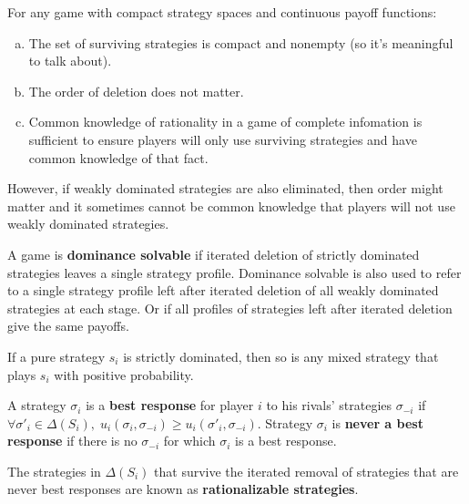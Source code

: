 \documentclass[10pt]{article}
\begin{document}
\begin{spacing}{1.0}
\begin{theorem}
  For any game with compact strategy spaces and continuous payoff functions:
  \begin{enumerate}[a)]\leftskip = 1em
  \item The set of surviving strategies is compact and
    nonempty (so it's meaningful to talk about).
  \item The order of deletion does not matter.
  \item Common knowledge of rationality in a game of complete infomation is
    sufficient to ensure players will only use surviving strategies and
    have common knowledge of that fact.
  \end{enumerate}
\end{theorem}

However, if weakly dominated strategies are also eliminated, then
order might matter and it sometimes cannot be common knowledge that players
will not use weakly dominated strategies.

\begin{definition}
  A game is \textbf{dominance solvable} if iterated deletion of strictly dominated
  strategies leaves a single strategy profile. Dominance solvable is also used to
  refer to a single strategy profile left after iterated deletion of all weakly
  dominated strategies at each stage. Or if all profiles of strategies left after
  iterated deletion give the same payoffs.
\end{definition}

\begin{lemma}
  If a pure strategy $s_i$ is strictly dominated, then so is any mixed
  strategy that plays $s_i$ with positive probability.
\end{lemma}

\begin{definition}
  A strategy $\sigma_i$ is a \textbf{best response} for
  player $i$ to his rivals' strategies $\sigma_{-i}$ if $\forall \sigma'_i
  \in \Delta(S_i),\; u_i(\sigma_i, \sigma_{-i}) \geq u_i(\sigma'_i,
  \sigma_{-i})$. Strategy $\sigma_i$ is \textbf{never a best response} if
  there is no $\sigma_{-i}$ for which $\sigma_i$ is a best response.
\end{definition}

\begin{definition}
  The strategies in $\Delta(S_i)$ that survive
  the iterated removal of strategies that are never best responses are
  known as \textbf{rationalizable strategies}.
\end{definition}


\end{spacing}
\end{document}
